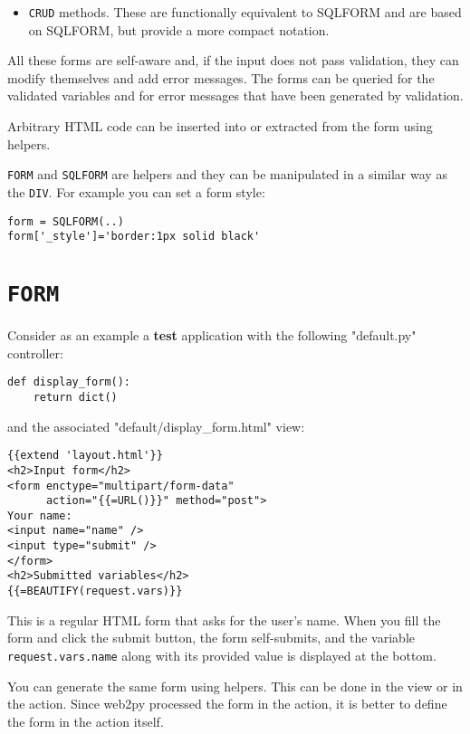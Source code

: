 \documentclass[justified,sixbynine,notoc]{tufte-book}
\def\ft{\small\tt}
\def\inxx#1{\index{#1}}
\begin{document}
\begin{fullwidth}
\begin{itemize}
\item {\ft CRUD} methods. These are functionally equivalent to SQLFORM and are based on SQLFORM, but provide a more compact notation.
\end{itemize}

All these forms are self-aware and, if the input does not pass validation, they can modify themselves and add error messages. The forms can be queried for the validated variables and for error messages that have been generated by validation.

Arbitrary HTML code can be inserted into or extracted from the form using helpers.

{\ft FORM} and {\ft SQLFORM} are helpers and they can be manipulated in a similar way as the {\ft DIV}. For example you can set a form style:

\begin{lstlisting}
form = SQLFORM(..)
form['_style']='border:1px solid black'
\end{lstlisting}

\goodbreak\section{{\ft FORM}}

\inxx{form} \inxx{accepts} \inxx{formname}

Consider as an example a {\bf test} application with the following "default.py" controller:
\begin{lstlisting}
def display_form():
    return dict()
\end{lstlisting}
\noindent and the associated "default/display\_form.html" view:
\begin{lstlisting}[keywords={}]
{{extend 'layout.html'}}
<h2>Input form</h2>
<form enctype="multipart/form-data"
      action="{{=URL()}}" method="post">
Your name:
<input name="name" />
<input type="submit" />
</form>
<h2>Submitted variables</h2>
{{=BEAUTIFY(request.vars)}}
\end{lstlisting}

This is a regular HTML form that asks for the user's name. When you fill the form and click the submit button, the form self-submits, and the variable {\ft request.vars.name} along with its provided value is displayed at the bottom.

You can generate the same form using helpers. This can be done in the view or in the action. Since web2py processed the form in the action, it is better to define the form in the action itself.


\end{fullwidth}
\end{document}
